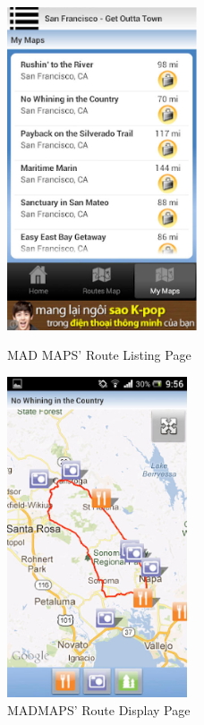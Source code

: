 \begin{figure}[!ht]
\centering
	\begin{minipage}{.49\textwidth}
		\begin{center}
			\includegraphics[width=0.5\textwidth]{images/mm-1.png}
			\caption{MAD MAPS' Route Listing Page}
		\end{center}
	\end{minipage}
	\begin{minipage}{.49\textwidth}
		\begin{center}
			\includegraphics[width=0.475\textwidth]{images/mm-2.png}
			\caption{MADMAPS' Route Display Page}
		\end{center}
	\end{minipage}
\end{figure}

